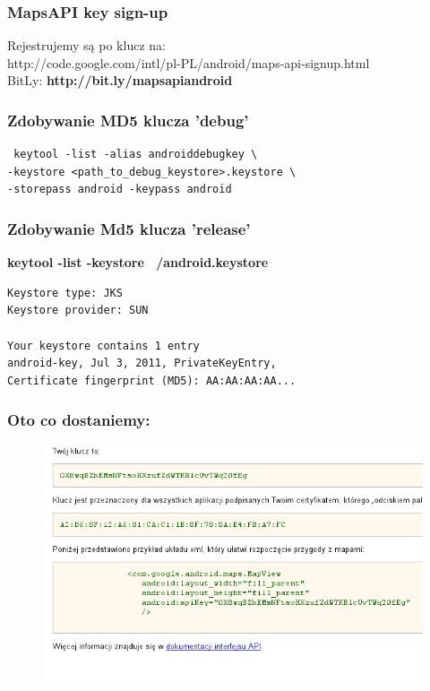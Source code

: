\documentclass{beamer}
\begin{document}
\begin{frame}\frametitle{MapsAPI key sign-up}
\begin{center}
  Rejestrujemy są po klucz na: \\
  http://code.google.com/intl/pl-PL/android/maps-api-signup.html \\
  BitLy: \textbf{http://bit.ly/mapsapiandroid}
\end{center}
\end{frame}


\begin{frame}[fragile]\frametitle{Zdobywanie MD5 klucza 'debug'}
\begin{lstlisting}
 keytool -list -alias androiddebugkey \
-keystore <path_to_debug_keystore>.keystore \
-storepass android -keypass android
\end{lstlisting}
\end{frame}


\begin{frame}[fragile]\frametitle{Zdobywanie Md5 klucza 'release'}

\textbf{keytool -list -keystore ~/android.keystore }

\begin{lstlisting}
Keystore type: JKS
Keystore provider: SUN

Your keystore contains 1 entry
android-key, Jul 3, 2011, PrivateKeyEntry, 
Certificate fingerprint (MD5): AA:AA:AA:AA...
\end{lstlisting}

\end{frame}


\begin{frame}\frametitle{Oto co dostaniemy:}
\begin{figure}
 \centering
 \includegraphics[width=\textwidth,keepaspectratio=true]{images/maps_get_key}
\end{figure} 
\end{frame}
\end{document}
